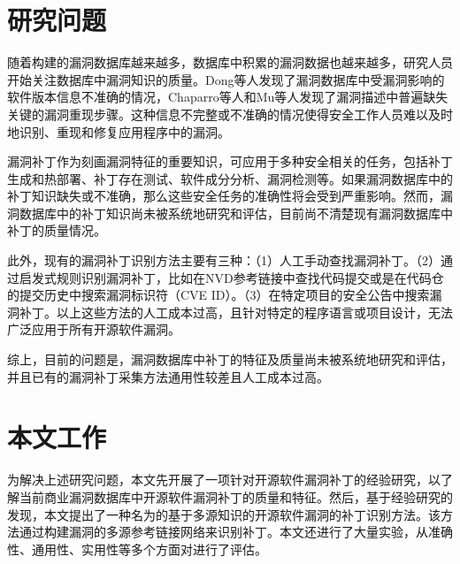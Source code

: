 \section{研究问题}
随着构建的漏洞数据库越来越多，数据库中积累的漏洞数据也越来越多，研究人员开始关注数据库中漏洞知识的质量。Dong等人\cite{dong2019towards}发现了漏洞数据库中受漏洞影响的软件版本信息不准确的情况，Chaparro等人\cite{chaparro2017detecting}和Mu等人\cite{mu2018understanding}发现了漏洞描述中普遍缺失关键的漏洞重现步骤。这种信息不完整或不准确的情况使得安全工作人员难以及时地识别、重现和修复应用程序中的漏洞。

漏洞补丁作为刻画漏洞特征的重要知识，可应用于多种安全相关的任务，包括补丁生成和热部署\cite{mulliner2013patchdroid,duan2019automating,xu2020automatic}、补丁存在测试\cite{zhang2018precise,jiang2020pdiff,dai2020bscout}、软件成分分析\cite{ponta2020detection,pashchenko2020vuln4real,Wang2020empirical}、漏洞检测\cite{li2016vulpecker,li2018vuldeepecker,jang2012redebug,kim2017vuddy, xiao2020mvp, cui2020vuldetector}等。如果漏洞数据库中的补丁知识缺失或不准确，那么这些安全任务的准确性将会受到严重影响。然而，漏洞数据库中的补丁知识尚未被系统地研究和评估，目前尚不清楚现有漏洞数据库中补丁的质量情况。

此外，现有的漏洞补丁识别方法主要有三种：（1）人工手动查找漏洞补丁\cite{xu2020automatic,jiang2020pdiff,dai2020bscout,zhou2017automated,sabetta2018practical,chen2020machine,xiao2020mvp,ponta2020detection,pashchenko2020vuln4real}。（2）通过启发式规则识别漏洞补丁，比如在NVD参考链接中查找代码提交\cite{duan2019automating,li2016vulpecker}或是在代码仓的提交历史中搜索漏洞标识符（CVE ID）\cite{you2017semfuzz,Wang2020empirical}。（3）在特定项目的安全公告中搜索漏洞补丁\cite{mulliner2013patchdroid,jang2012redebug,kim2017vuddy}。以上这些方法的人工成本过高，且针对特定的程序语言或项目设计，无法广泛应用于所有开源软件漏洞。

综上，目前的问题是，漏洞数据库中补丁的特征及质量尚未被系统地研究和评估，并且已有的漏洞补丁采集方法通用性较差且人工成本过高。

\section{本文工作}
为解决上述研究问题，本文先开展了一项针对开源软件漏洞补丁的经验研究，以了解当前商业漏洞数据库中开源软件漏洞补丁的质量和特征。然后，基于经验研究的发现，本文提出了一种名为\tool 的基于多源知识的开源软件漏洞的补丁识别方法。该方法通过构建漏洞的多源参考链接网络来识别补丁。本文还进行了大量实验，从准确性、通用性、实用性等多个方面对\tool 进行了评估。

